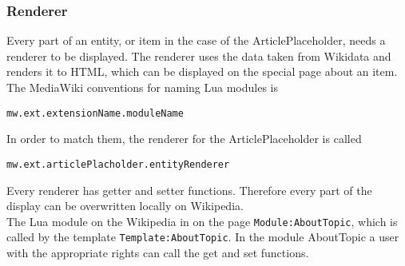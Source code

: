 \subsubsection{Renderer}

Every part of an entity, or item in the case of the ArticlePlaceholder, needs a renderer to be displayed. The renderer uses the data taken from Wikidata and renders it to HTML, which can be displayed on the special page about an item. \\
The MediaWiki conventions for naming Lua modules is 
\begin{center}
\texttt{mw.ext.extensionName.moduleName} 
\end{center}
In order to match them, the renderer for the ArticlePlaceholder is called 
\begin{center}
\texttt{mw.ext.articlePlacholder.entityRenderer}
\end{center}
Every renderer has getter and setter functions. Therefore every part of the display can be overwritten locally on Wikipedia. \\
The Lua module on the Wikipedia in on the page \texttt{Module:AboutTopic}, which is called by the template \texttt{Template:AboutTopic}. In the module AboutTopic a user with the appropriate rights can call the get and set functions. \\

